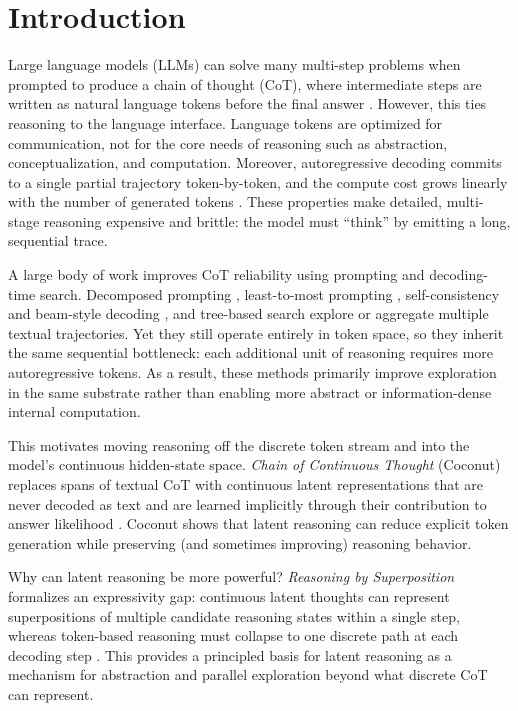 \section{Introduction}

Large language models (LLMs) can solve many multi-step problems when prompted to produce a chain of thought (CoT), where intermediate steps are written as natural language tokens before the final answer \cite{paper11}. However, this ties reasoning to the language interface. Language tokens are optimized for communication, not for the core needs of reasoning such as abstraction, conceptualization, and computation. Moreover, autoregressive decoding commits to a single partial trajectory token-by-token, and the compute cost grows linearly with the number of generated tokens \cite{paper14}. These properties make detailed, multi-stage reasoning expensive and brittle: the model must ``think'' by emitting a long, sequential trace.

A large body of work improves CoT reliability using prompting and decoding-time search. Decomposed prompting \cite{paper12}, least-to-most prompting \cite{paper13}, self-consistency and beam-style decoding \cite{paper16}, and tree-based search \cite{paper15} explore or aggregate multiple textual trajectories. Yet they still operate entirely in token space, so they inherit the same sequential bottleneck: each additional unit of reasoning requires more autoregressive tokens. As a result, these methods primarily improve exploration in the same substrate rather than enabling more abstract or information-dense internal computation.

This motivates moving reasoning off the discrete token stream and into the model’s continuous hidden-state space. \emph{Chain of Continuous Thought} (Coconut) replaces spans of textual CoT with continuous latent representations that are never decoded as text and are learned implicitly through their contribution to answer likelihood \cite{paper1}. Coconut shows that latent reasoning can reduce explicit token generation while preserving (and sometimes improving) reasoning behavior.

Why can latent reasoning be more powerful? \emph{Reasoning by Superposition} formalizes an expressivity gap: continuous latent thoughts can represent superpositions of multiple candidate reasoning states within a single step, whereas token-based reasoning must collapse to one discrete path at each decoding step \cite{paper3}. This provides a principled basis for latent reasoning as a mechanism for abstraction and parallel exploration beyond what discrete CoT can represent.

